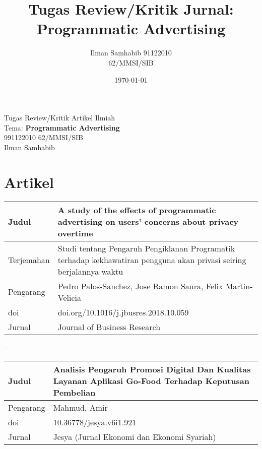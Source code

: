 \documentclass{article}
\title{Tugas Review/Kritik Jurnal: Programmatic Advertising}
\author{Ilman Samhabib 91122010\\62/MMSI/SIB}
\date{\today}
\begin{document}
\begin{center}
    Tugas Review/Kritik Artikel Ilmiah
    \\ Tema: \textbf{Programmatic Advertising} 
    \\ 991122010 62/MMSI/SIB
    \\ Ilman Samhabib
\end{center}
\section*{Artikel}
\begin{center}
    \begin{tabular}{|p{2cm}|p{12cm}|}
        \hline
        Judul & A study of the effects of programmatic advertising on users' concerns about privacy overtime \cite{PALO1961} \\
        \hline
        Terjemahan & Studi tentang Pengaruh Pengiklanan Programatik terhadap kekhawatiran pengguna akan privasi  seiring berjalannya waktu\\
        \hline
        Pengarang & Pedro Palos-Sanchez, Jose Ramon Saura, Felix Martin-Velicia\\
        \hline
        doi & doi.org/10.1016/j.jbusres.2018.10.059\\    
        \hline
        Jurnal & Journal of Business Research\\
        \hline
    \end{tabular}
    
\end{center}
---
\begin{center}
     \begin{tabular}{|p{2cm}|p{12cm}|}
        \hline
        Judul & Analisis Pengaruh Promosi Digital Dan Kualitas Layanan Aplikasi Go-Food Terhadap Keputusan Pembelian \cite{mahmud2023analisis}
         \\
        \hline
        Pengarang & Mahmud, Amir\\
        \hline
        doi & 10.36778/jesya.v6i1.921\\    
        \hline
        Jurnal & Jesya (Jurnal Ekonomi dan Ekonomi Syariah)\\
        \hline
    \end{tabular}
\end{center}
\end{document}
